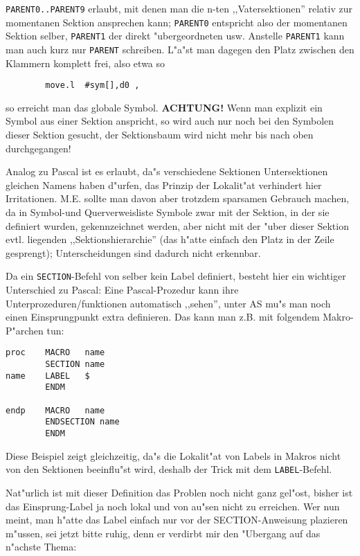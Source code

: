 \documentclass[12pt,a4paper,twoside]{report}
\newcommand{\bb}[1]{{\bf #1}}
\newcommand{\tty}[1]{{\tt #1}}
\begin{document}
\tty{PARENT0..PARENT9} erlaubt, mit denen man die n-ten ,,Vatersektionen''
relativ zur momentanen Sektion ansprechen kann; \tty{PARENT0} entspricht
also der momentanen Sektion selber, \tty{PARENT1} der direkt "ubergeordneten
usw.  Anstelle \tty{PARENT1} kann man auch kurz nur \tty{PARENT} schreiben.
L"a"st man dagegen den Platz zwischen den Klammern komplett frei, also
etwa so
\begin{verbatim}
        move.l  #sym[],d0 ,
\end{verbatim}
so erreicht man das globale Symbol.  \bb{ACHTUNG!} Wenn man explizit ein
Symbol aus einer Sektion anspricht, so wird auch nur noch bei den
Symbolen dieser Sektion gesucht, der Sektionsbaum wird nicht mehr
bis nach oben durchgegangen!
\par
Analog zu Pascal ist es erlaubt, da"s verschiedene Sektionen Untersektionen
gleichen Namens haben d"urfen, das Prinzip der Lokalit"at verhindert hier
Irritationen.  M.E. sollte man davon aber trotzdem sparsamen Gebrauch machen,
da in Symbol-und Querverweisliste Symbole zwar mit der Sektion, in der sie
definiert wurden, gekennzeichnet werden, aber nicht mit der "uber dieser
Sektion evtl. liegenden ,,Sektionshierarchie'' (das h"atte einfach den Platz
in der Zeile gesprengt); Unterscheidungen sind dadurch nicht erkennbar.
\par
Da ein \tty{SECTION}-Befehl von selber kein Label definiert, besteht hier
ein wichtiger Unterschied zu Pascal: Eine Pascal-Prozedur kann
ihre Unterprozeduren/funktionen automatisch ,,sehen'', unter AS mu"s man
noch einen Einsprungpunkt extra definieren.  Das kann man z.B. mit folgendem
Makro-P"archen tun:
\begin{verbatim}
proc    MACRO   name
        SECTION name
name    LABEL   $
        ENDM

endp    MACRO   name
        ENDSECTION name
        ENDM
\end{verbatim}
Diese Beispiel zeigt gleichzeitig, da"s die Lokalit"at von Labels in
Makros nicht von den Sektionen beeinflu"st wird, deshalb der Trick mit dem
\tty{LABEL}-Befehl.
\par
Nat"urlich ist mit dieser Definition das Problen noch nicht ganz gel"ost,
bisher ist das Einsprung-Label ja noch lokal und von au"sen nicht zu
erreichen.  Wer nun meint, man h"atte das Label einfach nur vor der
SECTION-Anweisung plazieren m"ussen, sei jetzt bitte ruhig, denn er
verdirbt mir den "Ubergang auf das n"achste Thema:

\end{document}
